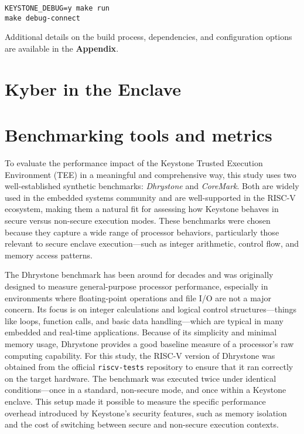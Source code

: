 \begin{verbatim}
KEYSTONE_DEBUG=y make run
make debug-connect
\end{verbatim}

Additional details on the build process, dependencies, and configuration options are available in the \textbf{Appendix}.

\section{Kyber in the Enclave}
\label{sec:kyber-enclave}

\section{Benchmarking tools and metrics}
\label{sec:benchmarking-tools}

To evaluate the performance impact of the Keystone Trusted Execution Environment (TEE) in a meaningful and comprehensive way, this study uses two well-established synthetic benchmarks: \textit{Dhrystone} and \textit{CoreMark}. Both are widely used in the embedded systems community and are well-supported in the RISC-V ecosystem, making them a natural fit for assessing how Keystone behaves in secure versus non-secure execution modes. These benchmarks were chosen because they capture a wide range of processor behaviors, particularly those relevant to secure enclave execution—such as integer arithmetic, control flow, and memory access patterns.

The Dhrystone benchmark\cite{weiss2002dhrystone} has been around for decades and was originally designed to measure general-purpose processor performance, especially in environments where floating-point operations and file I/O are not a major concern. Its focus is on integer calculations and logical control structures—things like loops, function calls, and basic data handling—which are typical in many embedded and real-time applications. Because of its simplicity and minimal memory usage, Dhrystone\cite{weiss2002dhrystone} provides a good baseline measure of a processor’s raw computing capability. For this study, the RISC-V version of Dhrystone\cite{weiss2002dhrystone} was obtained from the official \texttt{riscv-tests} repository to ensure that it ran correctly on the target hardware. The benchmark was executed twice under identical conditions—once in a standard, non-secure mode, and once within a Keystone enclave. This setup made it possible to measure the specific performance overhead introduced by Keystone’s security features, such as memory isolation and the cost of switching between secure and non-secure execution contexts.

